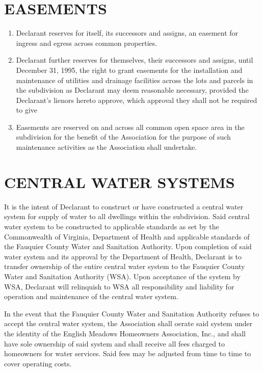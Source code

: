 \documentclass[12pt, letterpaper]{article}
\begin{document}
\section{EASEMENTS}
\begin{enumerate}
\item Declarant reserves for itself, its successors and assigns, an easement for ingress and egress across common properties.
\item Declarant further reserves for themselves, their successors and assigns, until December 31, 1995, the right to grant easements for the installation and maintenance of utilities and drainage facilities across the lots and parcels in the subdivision as Declarant may deem reasonable necessary, provided the Declarant's lienors hereto approve, which approval they shall not be required to give
\item Easements are reserved on and across all common open space area in the subdivision for the benefit of the Association for the purpose of such maintenance activities as the Association shall undertake.
\end{enumerate}

\section{CENTRAL WATER SYSTEMS}
It is the intent of Declarant to construct or have constructed a central water system for supply of water to all dwellings within the subdivision.
Said central water system to be constructed to applicable standards as set by the Commonwealth of Virginia, Department of Health and applicable standards of the Fauquier County Water and Sanitation Authority.
Upon completion of said water system and its approval by the Department of Health, Declarant is to transfer ownership of the entire central water system to the Fauquier County Water and Sanitation Authority (WSA).
Upon acceptance of the system by WSA, Declarant will relinquish to WSA all responsibility and liability for operation and maintenance of the central water system.

In the event that the Fauquier County Water and Sanitation Authority refuses to accept the central water system, the Association shall oerate said system under the identity of the English Meadows Homeowners Association, Inc., and shall have sole ownership of said system and shall receive all fees charged to homeowners for water services.
Said fees may be adjusted from time to time to cover operating costs.
\end{document}
